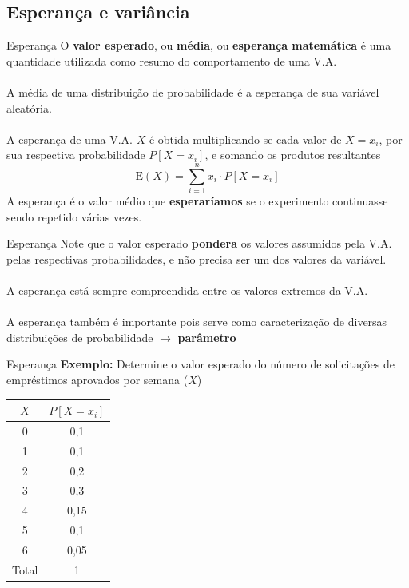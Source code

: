 \documentclass[10pt]{beamer}\usepackage[]{graphicx}\usepackage[]{color}
\providecommand{\E}{\text{E}}
\theoremstyle{definition}
\begin{document}
\subsection{Esperança e variância}

\begin{frame}[fragile]{Esperança}
  O \textbf{valor esperado}, ou \textbf{média}, ou \textbf{esperança
    matemática} é uma quantidade utilizada como resumo do comportamento
  de uma V.A. \\~\\
  A média de uma distribuição de probabilidade é a esperança de sua
  variável aleatória. \\~\\
  A esperança de uma V.A. $X$ é obtida multiplicando-se cada valor de $X
  = x_i$, por sua respectiva probabilidade $P[X = x_i]$, e somando os
  produtos resultantes
  \begin{equation*}
    \E(X) = \sum_{i = 1}^{n} x_i \cdot P[X = x_i]
  \end{equation*}
  A esperança é o valor médio que \textbf{esperaríamos} se o experimento
  continuasse sendo repetido várias vezes.
\end{frame}

\begin{frame}[fragile]{Esperança}
  Note que o valor esperado \textbf{pondera} os valores assumidos pela
  V.A. pelas respectivas probabilidades, e não precisa ser um dos
  valores da variável. \\~\\
  A esperança está sempre compreendida entre os valores extremos da
  V.A. \\~\\
  A esperança também é importante pois serve como caracterização de
  diversas distribuições de probabilidade $\rightarrow$
  \textbf{parâmetro}
\end{frame}

\begin{frame}[fragile]{Esperança}
  \textbf{Exemplo:} Determine o valor esperado do número de solicitações
  de empréstimos aprovados por semana ($X$)
  \begin{table}[h]
    \centering
    \begin{tabular}{cc}
      \hline
      $X$ & $P[X = x_i]$ \\
      \hline
      0 & 0,1 \\
      1 & 0,1 \\
      2 & 0,2 \\
      3 & 0,3 \\
      4 & 0,15 \\
      5 & 0,1 \\
      6 & 0,05 \\
      \hline
      Total & 1 \\
      \hline
    \end{tabular}
  \end{table}
\end{frame}
\end{document}

